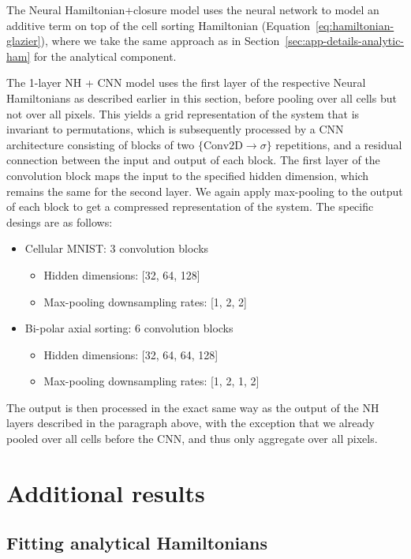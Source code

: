 The Neural Hamiltonian+closure model uses the neural network to model an additive term on top of the cell sorting Hamiltonian (Equation~\ref{eq:hamiltonian-glazier}), where we take the same approach as in Section~\ref{sec:app-details-analytic-ham} for the analytical component.

The 1-layer NH + CNN model uses the first layer of the respective Neural Hamiltonians as described earlier in this section, before pooling over all cells but not over all pixels. This yields a grid representation of the system that is invariant to permutations, which is subsequently processed by a CNN architecture consisting of blocks of two $\{\text{Conv2D} \rightarrow \sigma\}$ repetitions, and a residual connection between the input and output of each block. The first layer of the convolution block maps the input to the specified hidden dimension, which remains the same for the second layer. We again apply max-pooling to the output of each block to get a compressed representation of the system. The specific desings are as follows:

\begin{itemize}
    \item Cellular MNIST: 3 convolution blocks
    \begin{itemize}
        \item Hidden dimensions: [32, 64, 128]
        \item Max-pooling downsampling rates: [1, 2, 2]
    \end{itemize}
    \item Bi-polar axial sorting: 6 convolution blocks
    \begin{itemize}
        \item Hidden dimensions: [32, 64, 64, 128]
        \item Max-pooling downsampling rates: [1, 2, 1, 2]
    \end{itemize}
\end{itemize}

The output is then processed in the exact same way as the output of the NH layers described in the paragraph above, with the exception that we already pooled over all cells before the CNN, and thus only aggregate over all pixels.


\section{Additional results}


\subsection{Fitting analytical Hamiltonians}\label{sec:app-exp-0-more-results}

